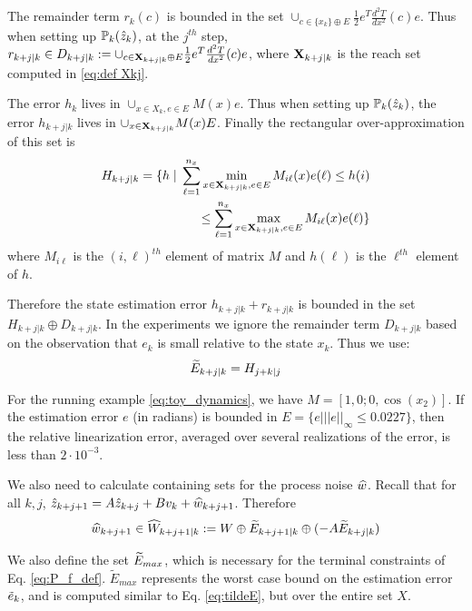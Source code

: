 The remainder term $r_k(c)$ is bounded in the set $\cup_{c \in \{x_k\} \oplus  E}   \frac{1}{2}e^T\frac{d^2T}{dx^2}(c)e$.
Thus when setting up $\mathbb{P}_{k}(\hat{z}_{k})$, at the $j^{th}$ step, 
$r_{k+j|k} \in D_{k+j|k} := \cup_{c \in \mathbf{X}_{k+j|k} \oplus  E}   \frac{1}{2}e^T\frac{d^2T}{dx^2}(c)e $,
where $\mathbf{X}_{k+j|k}$ is the reach set computed in \eqref{eq:def Xkj}.

The error $h_{k}$ lives in 
$\cup_{x\in X_{k}, e \in E}M(x)e$.
Thus when setting up $\mathbb{P}_{k}(\hat{z}_{k})$, the error $h_{k+j|k}$ lives in $\cup_{x \in \mathbf{X}_{k+j|k}}M(x)E$.
Finally the rectangular over-approximation of this set is 
\begin{eqnarray}
\label{eq:H}
H_{k+j|k} = \{h \;|\; \sum_{\ell=1}^{n_x} \min_{x \in \mathbf{X}_{k+j|k}, e \in E} M_{i\ell}(x)e(\ell)  \leq h(i) 
\nonumber 
\\
\leq \sum_{\ell=1}^{n_x} \max_{x \in \mathbf{X}_{k+j|k}, e \in E} M_{i\ell}(x)e(\ell) \}
\end{eqnarray}
where $M_{i\ell}$ is the $(i,\ell)^{th}$ element of matrix $M$ and $h(\ell)$ is the $\ell^{th}$ element of $h$.

Therefore the state estimation error $h_{k+j|k} + r_{k+j|k}$ is bounded in the set $H_{k+j|k} \oplus D_{k+j|k}$. 
In the experiments we ignore the remainder term $D_{k+j|k}$ based on the observation that $e_k$ is small relative to the state $x_k$. Thus we use:
\begin{eqnarray}
\label{eq:tildeE}
\widetilde{E}_{k+j|k} = H_{j+k|j}
\end{eqnarray}

\begin{exmp}
For the running example \eqref{eq:toy_dynamics}, we have $M = [1 ,  0;0 ,\cos(x_2)]$. 
If the estimation error $e$ (in radians) is bounded in $E = \lbrace e| ||e||_{\infty} \leq 0.0227\rbrace$,
then the relative linearization error, averaged over several realizations of the error, is less than $2\cdot 10^{-3}$.
\exmend
\end{exmp}

We also need to calculate containing sets for the process noise $\widehat{w}$.
Recall that for all $k,j$, 
$\hat{z}_{k+j+1} =  A\hat{z}_{k+j} + Bv_k + \widehat{w}_{k+j+1}$.
Therefore 
\begin{equation}
\label{eq:What}
\widehat{w}_{k+j+1} \in \widehat{W}_{k+j+1|k} := W \oplus \widetilde{E}_{k+j+1|k} \oplus(-A\widetilde{E}_{k+j|k})
\end{equation}

We also define the set $\widetilde{E}_{max}$, which is necessary for the terminal constraints of Eq. \eqref{eq:P_f_def}. $\tilde{E}_{max}$ represents the worst case bound on the estimation error $\tilde{e}_{k}$, and is computed similar to Eq. \eqref{eq:tildeE}, but over the entire set $X$. %

